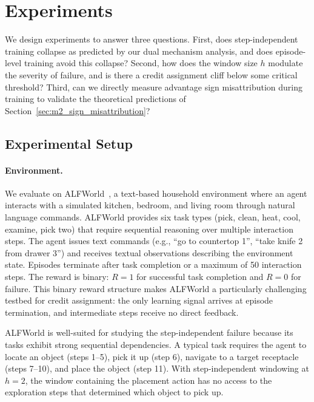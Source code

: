 \newcommand{\placeholder}[1]{\textcolor{red}{[#1]}}

\section{Experiments}
\label{sec:experiments}

We design experiments to answer three questions. First, does step-independent training collapse as predicted by our dual mechanism analysis, and does episode-level training avoid this collapse? Second, how does the window size $h$ modulate the severity of failure, and is there a credit assignment cliff below some critical threshold? Third, can we directly measure advantage sign misattribution during training to validate the theoretical predictions of Section~\ref{sec:m2_sign_misattribution}?

\subsection{Experimental Setup}
\label{sec:experimental_setup}

\paragraph{Environment.}
We evaluate on ALFWorld~\cite{shridhar2021alfworld}, a text-based household environment where an agent interacts with a simulated kitchen, bedroom, and living room through natural language commands. %
ALFWorld provides six task types (pick, clean, heat, cool, examine, pick two) that require sequential reasoning over multiple interaction steps. The agent issues text commands (e.g., ``go to countertop 1'', ``take knife 2 from drawer 3'') and receives textual observations describing the environment state. Episodes terminate after task completion or a maximum of 50 interaction steps. The reward is binary: $R = 1$ for successful task completion and $R = 0$ for failure. This binary reward structure makes ALFWorld a particularly challenging testbed for credit assignment: the only learning signal arrives at episode termination, and intermediate steps receive no direct feedback.

ALFWorld is well-suited for studying the step-independent failure because its tasks exhibit strong sequential dependencies. A typical task requires the agent to locate an object (steps 1--5), pick it up (step 6), navigate to a target receptacle (steps 7--10), and place the object (step 11). With step-independent windowing at $h = 2$, the window containing the placement action has no access to the exploration steps that determined which object to pick up.

